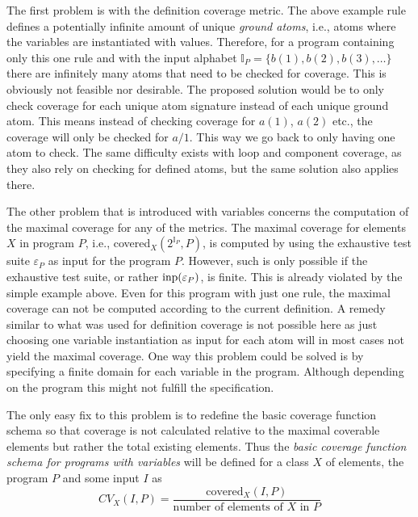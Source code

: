 The first problem is with the definition coverage metric. The above example rule defines a potentially infinite amount of unique \emph{ground atoms}, i.e., atoms where the variables are instantiated with values. Therefore, for a program containing only this one rule and with the input alphabet \(\mathbb{I}_P = \{b(1), b(2), b(3), \ldots\}\) there are infinitely many atoms that need to be checked for coverage. This is obviously not feasible nor desirable. The proposed solution would be to only check coverage for each unique atom signature instead of each unique ground atom. This means instead of checking coverage for $a(1)$, $a(2)$ etc., the coverage will only be checked for $a/1$. This way we go back to only having one atom to check. The same difficulty exists with loop and component coverage, as they also rely on checking for defined atoms, but the same solution also applies there.

The other problem that is introduced with variables concerns the computation of the maximal coverage for any of the metrics. The maximal coverage for elements $X$ in program $P$, i.e., covered$_X(2^{\mathbb{I}_P}, P)$, is computed by using the exhaustive test suite \(\varepsilon_P\) as input for the program $P$. However, such is only possible if the exhaustive test suite, or rather \(\operatorname{inp}(\varepsilon_P)\), is finite. This is already violated by the simple example above. Even for this program with just one rule, the maximal coverage can not be computed according to the current definition. A remedy similar to what was used for definition coverage is not possible here as just choosing one variable instantiation as input for each atom will in most cases not yield the maximal coverage. One way this problem could be solved is by specifying a finite domain for each variable in the program. Although depending on the program this might not fulfill the specification.

The only easy fix to this problem is to redefine the basic coverage function schema so that coverage is not calculated relative to the maximal coverable elements but rather the total existing elements. Thus the \emph{basic coverage function schema for programs with variables} will be defined for a class $X$ of elements, the program $P$ and some input $I$ as
\begin{equation}
\label{eq:coverage function schema for variables}
    CV_X(I, P) = \frac{\text{covered}_X(I, P)}{\text{number of elements of $X$ in $P$}}
\end{equation}

